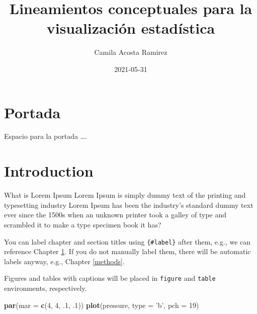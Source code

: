 \documentclass[
]{book}
\title{Lineamientos conceptuales para la visualización estadística}
\author{Camila Acosta Ramirez}
\date{2021-05-31}
\newenvironment{Shaded}{\begin{snugshade}}{\end{snugshade}}
\newcommand{\DataTypeTok}[1]{\textcolor[rgb]{0.13,0.29,0.53}{#1}}
\newcommand{\DecValTok}[1]{\textcolor[rgb]{0.00,0.00,0.81}{#1}}
\newcommand{\FloatTok}[1]{\textcolor[rgb]{0.00,0.00,0.81}{#1}}
\newcommand{\KeywordTok}[1]{\textcolor[rgb]{0.13,0.29,0.53}{\textbf{#1}}}
\newcommand{\NormalTok}[1]{#1}
\newcommand{\StringTok}[1]{\textcolor[rgb]{0.31,0.60,0.02}{#1}}
\begin{document}
\maketitle

{
\setcounter{tocdepth}{1}
\tableofcontents
}
\hypertarget{portada}{%
\chapter*{Portada}\label{portada}}

Espacio para la portada \ldots.

\hypertarget{intro}{%
\chapter{Introduction}\label{intro}}

What is Lorem Ipsum Lorem Ipsum is simply dummy text of the printing and typesetting industry Lorem Ipsum has been the industry's standard dummy text ever since the 1500s when an unknown printer took a galley of type and scrambled it to make a type specimen book it has?

You can label chapter and section titles using \texttt{\{\#label\}} after them, e.g., we can reference Chapter \ref{intro}. If you do not manually label them, there will be automatic labels anyway, e.g., Chapter \ref{methods}.

Figures and tables with captions will be placed in \texttt{figure} and \texttt{table} environments, respectively.

\begin{Shaded}
\begin{Highlighting}[]
\KeywordTok{par}\NormalTok{(}\DataTypeTok{mar =} \KeywordTok{c}\NormalTok{(}\DecValTok{4}\NormalTok{, }\DecValTok{4}\NormalTok{, }\FloatTok{.1}\NormalTok{, }\FloatTok{.1}\NormalTok{))}
\KeywordTok{plot}\NormalTok{(pressure, }\DataTypeTok{type =} \StringTok{'b'}\NormalTok{, }\DataTypeTok{pch =} \DecValTok{19}\NormalTok{)}
\end{Highlighting}
\end{Shaded}
\end{document}
